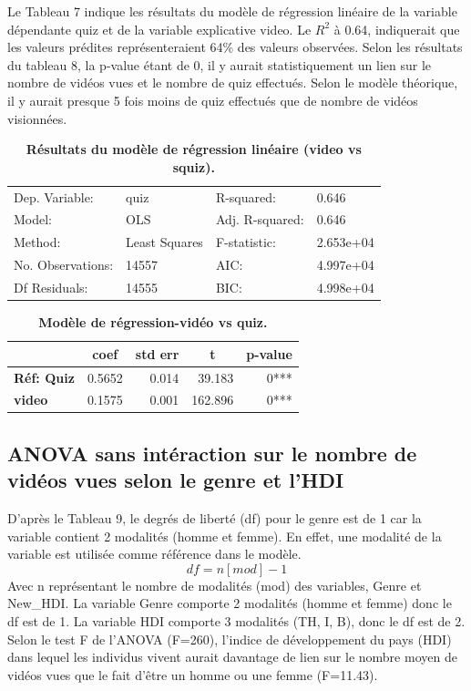 \documentclass[12pt, a4paper, titlepage, table]{article}
\begin{document}
Le Tableau 7 indique les résultats du modèle de régression linéaire de la variable dépendante quiz et de la variable explicative video. Le $R^2$ à 0.64, 
indiquerait que les valeurs prédites représenteraient 64\% des valeurs observées. 
Selon les résultats du tableau 8, la p-value étant de 0, il y aurait statistiquement un lien sur le nombre de vidéos vues et le nombre de quiz effectués. 
Selon le modèle théorique, il y aurait presque 5 fois moins de quiz effectués que de nombre de vidéos visionnées.

\begin{table}[H]
	\centering
	\fontsize{12}{20}\selectfont
	\begin{tabular}{|ll|ll|}
		\hline
			Dep. Variable:&	quiz&	R-squared:&	0.646\\
			Model:&	OLS&	Adj. R-squared:&	0.646\\
			Method:&	Least Squares&	F-statistic:&	2.653e+04\\
			No. Observations:&	14557&	AIC:&	4.997e+04\\
			Df Residuals:&	14555&	BIC:&	4.998e+04\\
		\hline
	\end{tabular}
\caption{\textbf{Résultats du modèle de régression linéaire (video vs squiz).}}
\end{table}
	
	
\begin{table}[H]
	\centering
	\fontsize{12}{20}\selectfont
	\begin{tabular}{|l|r|r|r|r|}
		\hline
			\multicolumn{1}{|c|}{\textbf{}}&
			\multicolumn{1}{c|}{\textbf{coef}}&
			\multicolumn{1}{c|}{\textbf{std err}}&
			\multicolumn{1}{c|}{\textbf{t}}&
			\multicolumn{1}{c|}{\textbf{p-value}}\\	
		\hline
		\textbf{Réf: Quiz}&	0.5652&	0.014&	39.183&	0***\\
		\textbf{video}&	0.1575&	0.001&	162.896&	0***\\
		\hline
\end{tabular}
\caption{\textbf{Modèle de régression-vidéo vs quiz.}}
\end{table}

	\subsection{ANOVA sans intéraction sur le nombre de vidéos vues selon le genre et l'HDI}
	
	D'après le Tableau 9, le degrés de liberté (df) pour le genre est de 1 car la variable contient 2 modalités (homme et femme).
	En effet, une modalité de la variable est utilisée comme référence dans le modèle.
	\[ df = n[mod] - 1 \]
	Avec n représentant le nombre de modalités (mod) des variables, Genre et New\_HDI.
	La variable Genre comporte 2 modalités (homme et femme) donc le df est de 1. La variable HDI comporte 3 modalités (TH, I, B), 
	donc le df est de 2. Selon le test F de l'ANOVA (F=260), l'indice de développement du pays (HDI) dans lequel les individus vivent aurait
	davantage de lien sur le nombre moyen de vidéos vues que le fait d'être un homme ou une femme (F=11.43).
	  
\end{document}
